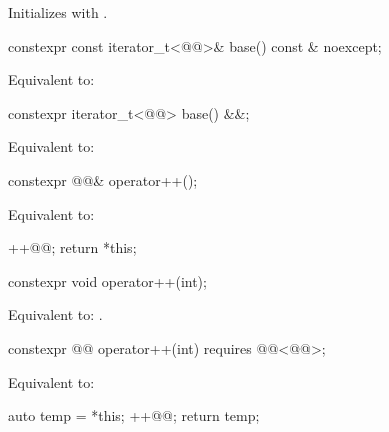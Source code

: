 \begin{itemdescr}
\pnum
\effects
Initializes  with .
\end{itemdescr}

%
\begin{itemdecl}
constexpr const iterator_t<@@>& base() const & noexcept;
\end{itemdecl}

\begin{itemdescr}
\pnum
\effects
Equivalent to: 
\end{itemdescr}

%
\begin{itemdecl}
constexpr iterator_t<@@> base() &&;
\end{itemdecl}

\begin{itemdescr}
\pnum
\effects
Equivalent to: 
\end{itemdescr}

%
\begin{itemdecl}
constexpr @@& operator++();
\end{itemdecl}

\begin{itemdescr}
\pnum
\effects
Equivalent to:
\begin{codeblock}
++@@;
return *this;
\end{codeblock}
\end{itemdescr}

%
\begin{itemdecl}
constexpr void operator++(int);
\end{itemdecl}

\begin{itemdescr}
\pnum
\effects
Equivalent to: .
\end{itemdescr}

%
\begin{itemdecl}
constexpr @@ operator++(int) requires @@<@@>;
\end{itemdecl}

\begin{itemdescr}
\pnum
\effects
Equivalent to:
\begin{codeblock}
auto temp = *this;
++@@;
return temp;
\end{codeblock}
\end{itemdescr}

